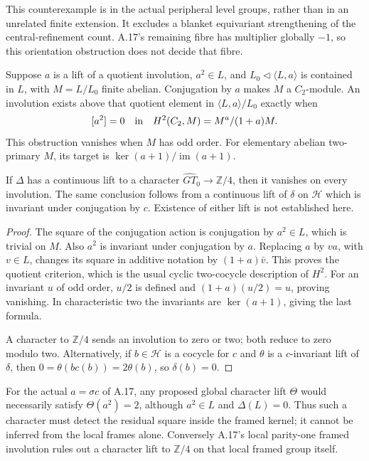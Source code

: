 This counterexample is in the actual peripheral level
groups, rather than in an unrelated finite extension.
It excludes a blanket equivariant strengthening of
the central-refinement count. A.17's remaining fibre
has multiplier globally \(-1\), so this orientation
obstruction does not decide that fibre.

Suppose \(a\) is a lift of a quotient involution,
\(a^2\in L\), and \(L_0\triangleleft\langle L,a\rangle\)
is contained in \(L\), with \(M=L/L_0\) finite abelian.
Conjugation by \(a\) makes \(M\) a \(C_2\)-module.
An involution exists above that quotient element in
\(\langle L,a\rangle/L_0\) exactly when
\[
 [a^2]=0\quad\hbox{in}\quad
 H^2(C_2,M)=M^{a}/(1+a)M.
\]
This obstruction vanishes when \(M\) has odd order.
For elementary abelian two-primary \(M\), its target is
\(\ker(a+1)/\operatorname{im}(a+1)\).

If \(\Delta\) has a continuous lift to a character
\(\widehat{GT}_0\to\mathbb Z/4\), then it vanishes on
every involution. The same conclusion follows from
a continuous lift of \(\delta\) on \(\mathcal H\)
which is invariant under conjugation by \(c\).
Existence of either lift is not established here.

\begin{proof}
The square of the conjugation action is conjugation
by \(a^2\in L\), which is trivial on \(M\).
Also \(a^2\) is invariant under conjugation by \(a\).
Replacing \(a\) by \(va\), with \(v\in L\), changes
its square in additive notation by \((1+a)\bar v\).
This proves the quotient criterion, which is the
usual cyclic two-cocycle description of \(H^2\).
For an invariant \(u\) of odd order, \(u/2\) is
defined and \((1+a)(u/2)=u\), proving vanishing.
In characteristic two the invariants are
\(\ker(a+1)\), giving the last formula.

A character to \(\mathbb Z/4\) sends an involution
to zero or two; both reduce to zero modulo two.
Alternatively, if \(b\in\mathcal H\) is a cocycle
for \(c\) and \(\theta\) is a \(c\)-invariant
lift of \(\delta\), then
\(0=\theta(bc(b))=2\theta(b)\), so
\(\delta(b)=0\).
\end{proof}

For the actual \(a=\sigma c\) of A.17, any proposed
global character lift \(\Theta\) would necessarily satisfy
\(\Theta(a^2)=2\), although \(a^2\in L\) and
\(\Delta(L)=0\). Thus such a character must detect the
residual square inside the framed kernel; it cannot be
inferred from the local frames alone. Conversely A.17's
local parity-one framed involution rules out a character
lift to \(\mathbb Z/4\) on that local framed group itself.

